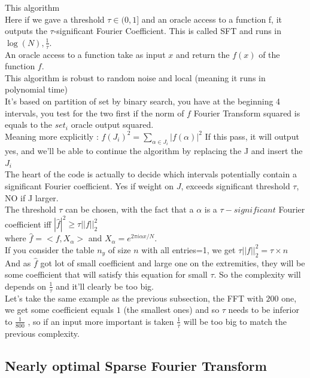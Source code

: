 \documentclass{article}
\begin{document}
This algorithm \\
Here if we gave a threshold $\tau \in (0,1]$ and an oracle access to a function f, it outputs the $\tau$-significant Fourier Coefficient. This is called SFT and runs in $\log(N),\frac{1}{\tau}$.\\
An oracle access to a function take as input $x$ and return the $f(x)$ of the function $f$.\\
This algorithm is robust to random noise and local (meaning it runs in polynomial time)\\
It's based on partition of set by binary search, you have at the beginning 4 intervals, you test for the two first if the norm of $f$ Fourier Transform squared is equals to the $set_i$ oracle output squared.\\
Meaning more explicitly : $f(J_i)^2 = \sum_{\alpha \in J_i}{|f(\alpha)|^2}$ If this pass, it will output yes, and we'll be able to continue the algorithm by replacing the J and insert the $J_i$\\
The heart of the code is actually to decide which intervals potentially contain a significant Fourier coefficient. Yes if weight on $J$, exceeds significant threshold $\tau$, NO if J larger.\\
The threshold $\tau$ can be chosen, with the fact that a $\alpha$ is a $\tau -significant$ Fourier coefficient iff $|\hat{f}|^2 \geq \tau||f||^{2}_2$\\ where $\hat{f} = <f,X_{\alpha}>$ and $X_{\alpha} = e^{2\pi i \alpha x/N}$.\\
If you consider the table $n_y$ of size $n$ with all entries=1, we get $\tau||f||^{2}_2 = \tau \times n$\\
And as $\hat{f}$ got lot of small coefficient and large one on the extremities, they will be some coefficient that will satisfy this equation for small $\tau$. So the complexity will depends on $\frac{1}{\tau}$ and it'll clearly be too big.\\
Let's take the same example as the previous subsection, the FFT with $200$ one, we get some coefficient equals $1$ (the smallest ones) and so $\tau$ needs to be inferior to $\frac{1}{800}$ , so if an input more important is taken $\frac{1}{\tau}$ will be too big to match the previous complexity.\\

\subsection{Nearly optimal Sparse Fourier Transform}
\end{document}
